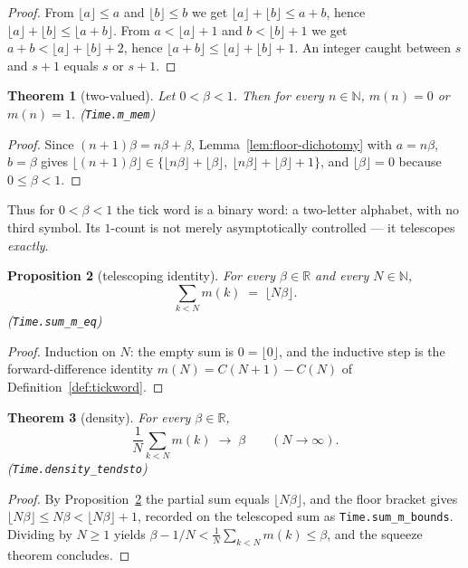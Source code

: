\documentclass[11pt]{amsart}
\theoremstyle{plain}
\newtheorem{theorem}{Theorem}[section]
\newtheorem{proposition}[theorem]{Proposition}
\theoremstyle{definition}
\theoremstyle{remark}
\begin{document}
\begin{proof}
From $\lfloor a \rfloor \le a$ and $\lfloor b \rfloor \le b$ we get $\lfloor a \rfloor + \lfloor b \rfloor \le a + b$, hence $\lfloor a \rfloor + \lfloor b \rfloor \le \lfloor a + b \rfloor$. From $a < \lfloor a \rfloor + 1$ and $b < \lfloor b \rfloor + 1$ we get $a + b < \lfloor a \rfloor + \lfloor b \rfloor + 2$, hence $\lfloor a + b \rfloor \le \lfloor a \rfloor + \lfloor b \rfloor + 1$. An integer caught between $s$ and $s + 1$ equals $s$ or $s + 1$.
\end{proof}

\begin{theorem}[two-valued]\label{thm:twovalued}
Let $0 < \beta < 1$. Then for every $n \in \mathbb{N}$, $m(n) = 0$ or $m(n) = 1$. (\texttt{Time.m\_mem})
\end{theorem}

\begin{proof}
Since $(n+1)\beta = n\beta + \beta$, Lemma~\ref{lem:floor-dichotomy} with $a = n\beta$, $b = \beta$ gives $\lfloor (n+1)\beta \rfloor \in \{\lfloor n\beta \rfloor + \lfloor \beta \rfloor,\ \lfloor n\beta \rfloor + \lfloor \beta \rfloor + 1\}$, and $\lfloor \beta \rfloor = 0$ because $0 \le \beta < 1$.
\end{proof}

Thus for $0 < \beta < 1$ the tick word is a binary word: a two-letter alphabet, with no third symbol. Its $1$-count is not merely asymptotically controlled --- it telescopes \emph{exactly}.

\begin{proposition}[telescoping identity]\label{prop:telescope}
For every $\beta \in \mathbb{R}$ and every $N \in \mathbb{N}$,
\[
  \sum_{k < N} m(k) \;=\; \lfloor N\beta \rfloor.
\]
(\texttt{Time.sum\_m\_eq})
\end{proposition}

\begin{proof}
Induction on $N$: the empty sum is $0 = \lfloor 0 \rfloor$, and the inductive step is the forward-difference identity $m(N) = C(N+1) - C(N)$ of Definition~\ref{def:tickword}.
\end{proof}

\begin{theorem}[density]\label{thm:density}
For every $\beta \in \mathbb{R}$,
\[
  \frac{1}{N} \sum_{k < N} m(k) \;\longrightarrow\; \beta
  \qquad (N \to \infty).
\]
(\texttt{Time.density\_tendsto})
\end{theorem}

\begin{proof}
By Proposition~\ref{prop:telescope} the partial sum equals $\lfloor N\beta \rfloor$, and the floor bracket gives $\lfloor N\beta \rfloor \le N\beta < \lfloor N\beta \rfloor + 1$, recorded on the telescoped sum as \texttt{Time.sum\_m\_bounds}. Dividing by $N \ge 1$ yields $\beta - 1/N < \frac{1}{N}\sum_{k<N} m(k) \le \beta$, and the squeeze theorem concludes.
\end{proof}
\end{document}
